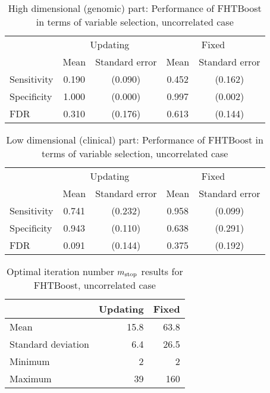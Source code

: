 \begin{table}
\caption{High dimensional (genomic) part: Performance of FHTBoost in terms of variable selection, uncorrelated case}
\label{table:uncorrelated-y0}
\centering
\begin{tabular}{l|cc|cc}
\toprule
& \multicolumn{2}{c}{Updating} & \multicolumn{2}{c}{Fixed} \\
& Mean & Standard error & Mean & Standard error \\
\hline
Sensitivity & 0.190 & (0.090) & 0.452 & (0.162) \\
Specificity & 1.000 & (0.000) & 0.997 & (0.002) \\
FDR         & 0.310 & (0.176) & 0.613 & (0.144) \\
\bottomrule
\end{tabular}
\end{table}

\begin{table}
\caption{Low dimensional (clinical) part: Performance of FHTBoost in terms of variable selection, uncorrelated case}
\label{table:uncorrelated-mu}
\centering
\begin{tabular}{l|cc|cc}
\toprule
& \multicolumn{2}{c}{Updating} & \multicolumn{2}{c}{Fixed} \\
& Mean & Standard error & Mean & Standard error \\
\hline
Sensitivity & 0.741 & (0.232) & 0.958 & (0.099) \\
Specificity & 0.943 & (0.110) & 0.638 & (0.291) \\
FDR         & 0.091 & (0.144) & 0.375 & (0.192) \\
\bottomrule
\end{tabular}
\end{table}

\begin{table}
\caption{Optimal iteration number $m_{\text{stop}}$ results for FHTBoost, uncorrelated case}
\label{table:uncorrelated-mstop}
\centering
\begin{tabular}{l|rr}
\toprule
& Updating & Fixed \\
\hline
Mean               &  15.8  &  63.8  \\
Standard deviation &   6.4  &  26.5  \\
Minimum            &     2  &     2  \\
Maximum            &    39  &   160  \\
\bottomrule
\end{tabular}
\end{table}

